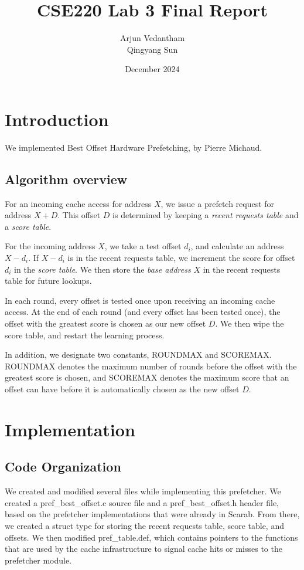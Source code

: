 \documentclass{article}
\title{CSE220 Lab 3 Final Report}
\author{Arjun Vedantham \\ Qingyang Sun}
\date{December 2024}
\begin{document}
\maketitle

\section{Introduction}
We implemented Best Offset Hardware Prefetching, by Pierre Michaud. \cite{7446087}
\subsection{Algorithm overview}
For an incoming cache access for address $X$, we issue a prefetch request for address $X+D$. This offset $D$ is determined by keeping a \textit{recent requests table} and a \textit{score table}. 

For the incoming address $X$, we take a test offset $d_i$, and calculate an address $X - d_i$. If $X - d_i$ is in the recent requests table, we increment the score for offset $d_i$ in the \textit{score table}. We then store the \textit{base address} $X$ in the recent requests table for future lookups. 

In each round, every offset is tested once upon receiving an incoming cache access. At the end of each round (and every offset has been tested once), the offset with the greatest score is chosen as our new offset $D$. 
We then wipe the score table, and restart the learning process. 

In addition, we designate two constants, ROUNDMAX and SCOREMAX. ROUNDMAX denotes the maximum number of rounds before the offset with the greatest score is chosen, and SCOREMAX denotes the maximum
score that an offset can have before it is automatically chosen as the new offset $D$. 

\section{Implementation}
\subsection{Code Organization}
We created and modified several files while implementing this prefetcher. We created a pref\_best\_offset.c source file and a pref\_best\_offset.h header file, based on the 
prefetcher implementations that were already in Scarab. From there, we created a struct type for storing the recent requests table, score table, and offsets. We then modified pref\_table.def, 
which contains pointers to the functions that are used by the cache infrastructure to signal cache hits or misses to the prefetcher module. 
\end{document}

